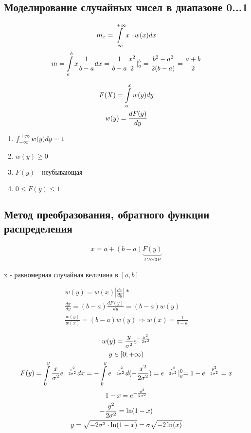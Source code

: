 \documentclass[14pt,a4paper,oneside]{extarticle}
\begin{document}
\subsection{Моделирование случайных чисел в диапазоне 0...1}

\begin{gather*}
    m_x=\int\displaylimits_{-\infty}^{+\infty} x\cdot w(x)dx\\
    m=\int\displaylimits_{a}^{b}x\frac{1}{b-a}dx=\frac{1}{b-a}\frac{x^2}{2}|_a^b=\frac{b^2-a^2}{2(b-a)}=\frac{a+b}{2}
\end{gather*}

\begin{gather*}
    F(X)=\int\displaylimits_{a}^{x}w(y)dy\\
    w(y)=\frac{dF(y)}{dy}\\
\end{gather*}

\begin{enumerate}
    \item $\int\displaylimits_{-\infty}^{+\infty}w(y)dy=1$
    \item $w(y)\geq 0$
    \item $F(y)$ - неубывающая
    \item $0\leq F(y)\leq 1$
\end{enumerate}

\subsection{Метод преобразования, обратного функции распределения}

\begin{gather*}
    x=a+(b-a)\underbrace{F(y)}_{CB \forall 3P}
\end{gather*}

x - равномерная случайная величина в $[a,b]$

\begin{gather*}
    w(y)=w(x)\left\lvert\frac{dx}{dy} \right\rvert *\\
    \frac{dx}{dy}=(b-a)\frac{dF(y)}{dy}=(b-a)w(y)\\
    \frac{w(y)}{w(x)}=(b-a)w(y)\Longrightarrow w(x) = \frac{1}{b-a}
\end{gather*}

\begin{gather*}
    w(y)=\frac{y}{\sigma^2}e^{-\frac{y^2}{2\sigma^2}}\\
    y\in[0;+\infty)\\
    F(y)=\int\displaylimits_{0}^{y}\frac{x}{\sigma^2}e^{-\frac{x^2}{2\sigma^2}}dx=-\int\displaylimits_{0}^{y}e^{-\frac{x^2}{2\sigma^2}}d(-\frac{x^2}{2\sigma^2})=e^{-\frac{x^2}{2\sigma^2}}\lvert_y^0=1-e^{-\frac{y^2}{2\sigma^2}}=x\\
    1-x=e^{-\frac{y^2}{2\sigma^2}}\\
    -\frac{y^2}{2\sigma^2}=\ln(1-x)\\
    y=\sqrt{-2\sigma^2\cdot\ln(1-x)}=\sigma\sqrt{-2\ln(x)}\\
\end{gather*}
\end{document}
